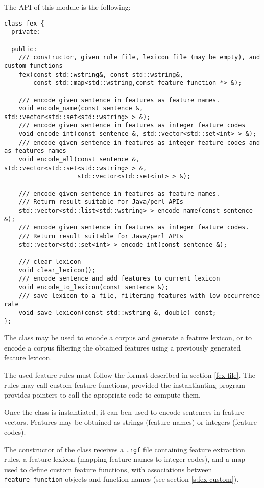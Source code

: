 \documentclass[a4paper]{book}
\begin{document}
  The API of this module is the following:
\begin{verbatim}
class fex {
  private:

  public:
    /// constructor, given rule file, lexicon file (may be empty), and custom functions
    fex(const std::wstring&, const std::wstring&, 
        const std::map<std::wstring,const feature_function *> &);

    /// encode given sentence in features as feature names. 
    void encode_name(const sentence &, std::vector<std::set<std::wstring> > &);
    /// encode given sentence in features as integer feature codes
    void encode_int(const sentence &, std::vector<std::set<int> > &);
    /// encode given sentence in features as integer feature codes and as features names
    void encode_all(const sentence &, std::vector<std::set<std::wstring> > &, 
                    std::vector<std::set<int> > &);

    /// encode given sentence in features as feature names. 
    /// Return result suitable for Java/perl APIs
    std::vector<std::list<std::wstring> > encode_name(const sentence &);
    /// encode given sentence in features as integer feature codes.
    /// Return result suitable for Java/perl APIs
    std::vector<std::set<int> > encode_int(const sentence &);

    /// clear lexicon
    void clear_lexicon(); 
    /// encode sentence and add features to current lexicon
    void encode_to_lexicon(const sentence &);
    /// save lexicon to a file, filtering features with low occurrence rate
    void save_lexicon(const std::wstring &, double) const;
};
\end{verbatim}

  The class may be used to encode a corpus and generate a feature lexicon,
  or to encode a corpus filtering the obtained features using a previously 
  generated feature lexicon.

  The used feature rules must follow the format described in 
  section \ref{fex-file}. The rules may call custom feature functions, provided
  the instantianting program provides pointers to call the apropriate code
  to compute them.

  Once the class is instantiated, it can ben used to encode sentences
  in feature vectors.  Features may be obtained as strings (feature
  names) or integers (feature codes).

  The constructor of the class receives a \texttt{.rgf} file
  containing feature extraction rules, a feature lexicon (mapping
  feature names to integer codes), and a map used to define 
  custom feature functions, with associations between
  \texttt{feature\_function} objects and function names (see section \ref{s:fex-custom}).
\end{document}
